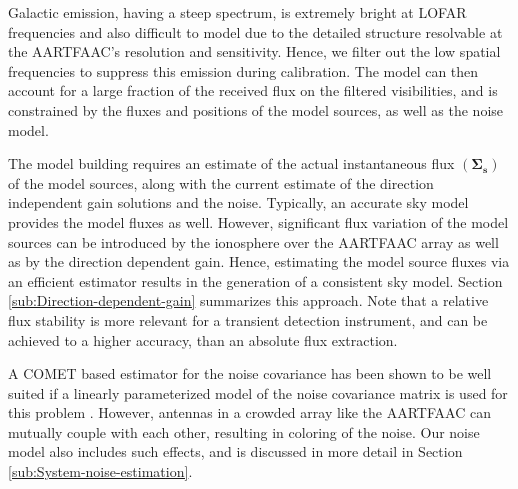 \documentclass{aa}
\begin{document}
Galactic  emission,  having a  steep  spectrum,  is  extremely bright  at  LOFAR
frequencies and also difficult to model due to the detailed structure resolvable
at  the AARTFAAC's  resolution and  sensitivity. Hence,  we filter  out  the low
spatial frequencies to suppress this  emission during calibration. The model can
then  account  for  a large  fraction  of  the  received  flux on  the  filtered
visibilities,  and is  constrained  by the  fluxes  and positions  of the  model
sources, as well as the noise model. 

The  model  building requires  an  estimate  of  the actual  instantaneous  flux
$\left(\mathbf{\Sigma_{s}}\right)$ of the model  sources, along with the current
estimate of the  direction independent gain solutions and  the noise. Typically,
an accurate sky  model provides the model fluxes  as well.  However, significant
flux variation of the model sources can be introduced by the ionosphere over the
AARTFAAC array  as well as by  the direction dependent  gain.  Hence, estimating
the model source fluxes via an  efficient estimator results in the generation of
a consistent  sky model.  Section  \ref{sub:Direction-dependent-gain} summarizes
this  approach.  Note  that a  relative flux  stability is  more relevant  for a
transient detection instrument, and can be achieved to a higher accuracy, than an
absolute flux extraction.  

A  COMET based estimator  for the  noise covariance  has been  shown to  be well
suited if a linearly parameterized model  of the noise covariance matrix is used
for this problem \citep{ottersten1998covariance}.  However, antennas in a crowded
array  like the  AARTFAAC  can mutually  couple  with each  other, resulting  in
coloring  of the  noise. Our  noise  model also  includes such  effects, and  is
discussed in more detail in Section \ref{sub:System-noise-estimation}.

\end{document}
